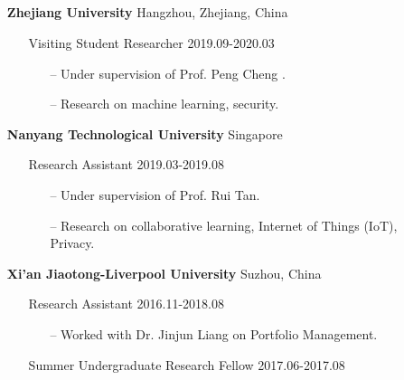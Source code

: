 \documentclass[11pt]{article}
\begin{document}
\subsection*{}
\begin{itemize}[leftmargin=0em, noitemsep, nolistsep]
    \setlength\itemsep{1em}
    \item[] \large\textbf{Zhejiang University} \hfill Hangzhou, Zhejiang, China
        \begin{itemize}[noitemsep, nolistsep, leftmargin=0em]
            \item[] {Visiting Student Researcher} \hfill 2019.09-2020.03
             \begin{itemize}
                \small
                \item[--] Under supervision of Prof. Peng Cheng .
                \item[--] Research on machine learning, security.
             \end{itemize}
        \end{itemize} 
    \item[] \large\textbf{Nanyang Technological University} \hfill Singapore
        \begin{itemize}[noitemsep, nolistsep, leftmargin=0em]
            \item[] Research Assistant \hfill 2019.03-2019.08
             \begin{itemize}
                \small
                \item[--] Under supervision of Prof. Rui Tan.
                \item[--] Research on collaborative learning, Internet of Things (IoT), Privacy.
             \end{itemize}
        \end{itemize} 
    \item[] \large\textbf{Xi'an Jiaotong-Liverpool University} \hfill Suzhou, China
        \begin{itemize}[noitemsep, nolistsep, leftmargin=0em]
            \item[] Research Assistant \hfill 2016.11-2018.08
             \begin{itemize}
                \small
                \item[--] Worked with Dr. Jinjun Liang on Portfolio Management.
             \end{itemize}
            \item[] Summer Undergraduate Research Fellow \hfill 2017.06-2017.08
             \begin{itemize}

\end{itemize}
\end{itemize}
\end{itemize}
\end{document}
